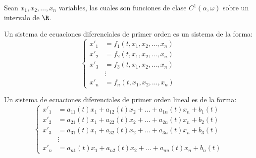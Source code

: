 \documentclass[../main.tex]{subfiles}
\begin{document}
Sean \(x_1, x_2, \dots, x_n\) variables, las cuales son funciones de clase 
\(C^1(\alpha, \omega)\) sobre un intervalo de \(\R\).

\begin{definition}
	Un sistema de ecuaciones diferenciales de primer orden es un sistema de la
	forma:
	\[\begin{cases}
			x'_1 &= f_1(t, x_1, x_2, \dots, x_n) \\
			x'_2 &= f_2(t, x_1, x_2, \dots, x_n) \\
			x'_3 &= f_3(t, x_1, x_2, \dots, x_n) \\
				 &\vdots \\
			x'_n &= f_n(t, x_1, x_2, \dots, x_n)
	  \end{cases}\]
\end{definition}

\begin{definition}
	Un sistema de ecuaciones diferenciales de primer orden lineal es de la
	forma:
	\[\begin{cases}
		x'_1 &= a_{11}(t)x_1 + a_{12}(t)x_2 + \dots + a_{1n}(t)x_n + b_1(t) \\
		x'_2 &= a_{21}(t)x_1 + a_{22}(t)x_2 + \dots + a_{2n}(t)x_n + b_2(t) \\
		x'_3 &= a_{31}(t)x_1 + a_{32}(t)x_2 + \dots + a_{3n}(t)x_n + b_3(t) \\
			 &\vdots \\
		x'_n &= a_{n1}(t)x_1 + a_{n2}(t)x_2 + \dots + a_{nn}(t)x_n + b_n(t)
	  \end{cases}\]
\end{definition}
\end{document}
